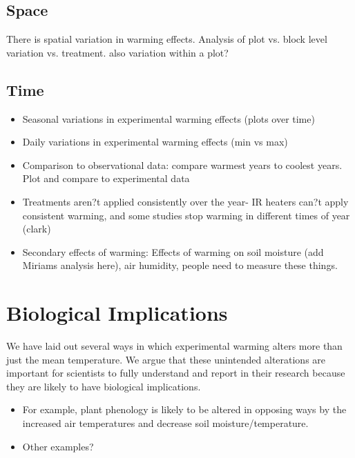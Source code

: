 \documentclass{article}
\begin{document}
\subsection{Space}
There is spatial variation in warming effects. Analysis of plot vs. block level variation vs. treatment. also variation within a plot?
\subsection{Time}
\begin{itemize}
\item Seasonal variations in experimental warming effects (plots over time)
\item Daily variations in experimental warming effects (min vs max) 
\item Comparison to observational data: compare warmest years to coolest years. Plot and compare to experimental data
\item Treatments aren?t applied consistently over the year- IR heaters can?t apply consistent warming, and some studies stop warming in different times of year (clark)
\item Secondary effects of warming: Effects of warming on soil moisture (add Miriams analysis here), air humidity, people need to measure these things.
\end{itemize}
\section {Biological Implications}
We have laid out several ways in which experimental warming alters more than just the mean temperature. We argue that these unintended alterations are important for scientists to fully understand and report in their research because they are likely to have biological implications. 
\begin{itemize}
\item For example, plant phenology is likely to be altered in opposing ways by the increased air temperatures and decrease soil moisture/temperature. 
\item Other examples?
\end{itemize}
\end{document}
